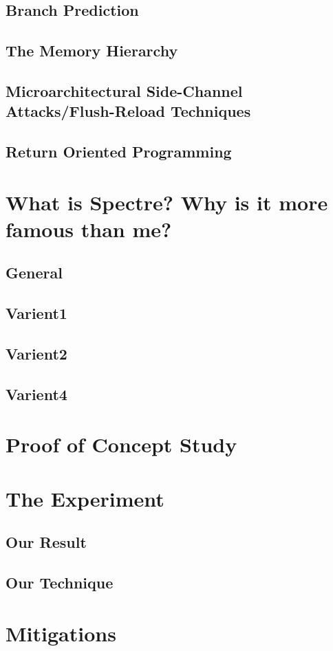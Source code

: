 \documentclass[12pt]{article}
\begin{document}
\subsection{Branch Prediction}
\subsection{The Memory Hierarchy}
\subsection{Microarchitectural Side-Channel Attacks/Flush-Reload Techniques}
\subsection{Return Oriented Programming}
\section{What is Spectre? Why is it more famous than me?}
\subsection{General}
\subsection{Varient1}
\subsection{Varient2}
\subsection{Varient4}
\section{Proof of Concept Study}
\section{The Experiment}
\subsection{Our Result}
\subsection{Our Technique}
\newpage
\section{Mitigations}
\end{document}
